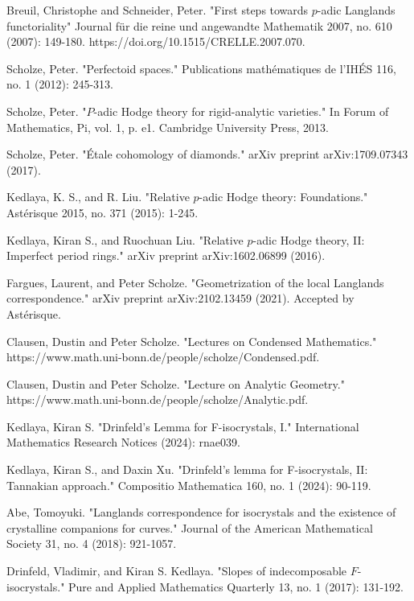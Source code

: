 \documentclass[12pt]{book}
\theoremstyle{definition}
\begin{document}
\begin{thebibliography}{}
 Breuil, Christophe and Schneider, Peter. "First steps towards $p$-adic Langlands functoriality" Journal f\"ur die reine und angewandte Mathematik 2007, no. 610 (2007): 149-180. https://doi.org/10.1515/CRELLE.2007.070.

 Scholze, Peter. "Perfectoid spaces." Publications math\'ematiques de l'IH\'ES 116, no. 1 (2012): 245-313.

 Scholze, Peter. "$P$-adic Hodge theory for rigid-analytic varieties." In Forum of Mathematics, Pi, vol. 1, p. e1. Cambridge University Press, 2013. 

 Scholze, Peter. "\'Etale cohomology of diamonds." arXiv preprint arXiv:1709.07343 (2017).

 Kedlaya, K. S., and R. Liu. "Relative $p$-adic Hodge theory: Foundations." Ast\'erisque 2015, no. 371 (2015): 1-245.

 Kedlaya, Kiran S., and Ruochuan Liu. "Relative $p$-adic Hodge theory, II: Imperfect period rings." arXiv preprint arXiv:1602.06899 (2016).

 Fargues, Laurent, and Peter Scholze. "Geometrization of the local Langlands correspondence." arXiv preprint arXiv:2102.13459 (2021). Accepted by Ast\'erisque.

 Clausen, Dustin and Peter Scholze. "Lectures on Condensed Mathematics." https://www.math.uni-bonn.de/people/scholze/Condensed.pdf.

 Clausen, Dustin and Peter Scholze. "Lecture on Analytic Geometry." https://www.math.uni-bonn.de/people/scholze/Analytic.pdf.

 Kedlaya, Kiran S. "Drinfeld's Lemma for F-isocrystals, I." International Mathematics Research Notices (2024): rnae039.

 Kedlaya, Kiran S., and Daxin Xu. "Drinfeld's lemma for F-isocrystals, II: Tannakian approach." Compositio Mathematica 160, no. 1 (2024): 90-119.

 Abe, Tomoyuki. "Langlands correspondence for isocrystals and the existence of crystalline companions for curves." Journal of the American Mathematical Society 31, no. 4 (2018): 921-1057.

 Drinfeld, Vladimir, and Kiran S. Kedlaya. "Slopes of indecomposable $ F $-isocrystals." Pure and Applied Mathematics Quarterly 13, no. 1 (2017): 131-192.


\end{thebibliography}
\end{document}
